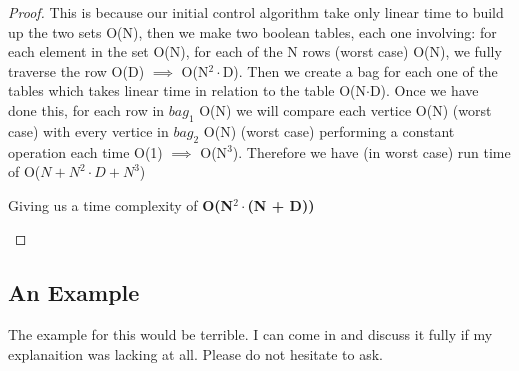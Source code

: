 \documentclass[12pt]{article}
\begin{document}
\begin{proof}
This is because our initial control algorithm take only linear time to build up the two sets O(N),
then we make two boolean tables, each one involving: for each element in the set O(N), for each of the
N rows (worst case) O(N), we fully traverse the row O(D) $\implies$ O(N$^2\cdot$D). Then we create a bag
for each one of the tables which takes linear time in relation to the table O(N$\cdot$D). Once we have
done this, for each row in $bag_1$ O(N) we will compare each vertice O(N) (worst case) with every vertice
in $bag_2$ O(N) (worst case) performing a constant operation each time O(1) $\implies$ O(N$^3$). Therefore
we have (in worst case) run time of O($N + N^2\cdot D + N^3$)
\begin{center}
    Giving us a time complexity of \textbf{O(N$^2\cdot$(N + D))}
\end{center}
\end{proof}


\subsection{An Example}
The example for this would be terrible. I can come in and discuss it fully if my explanaition was lacking
at all. Please do not hesitate to ask.

\end{document}

